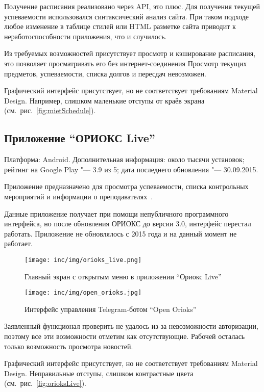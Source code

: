Получение расписания реализовано через API, это плюс.
Для получения текущей успеваемости использовался синтаксический анализ сайта.
При таком подходе любое изменение в таблице стилей или HTML разметке сайта приводит к неработоспособности приложения, что и случилось.

Из требуемых возможностей присутствует просмотр и кэширование расписания, это позволяет просматривать его без интернет-соединения
Просмотр текущих предметов, успеваемости, списка долгов и пересдач невозможен.

Графический интерфейс присутствует, но не соответствует требованиям Material Design.
Например, слишком маленькие отступы от краёв экрана (см.~рис.~\ref{fig:mietSchedule}).

\subsection{Приложение ``ОРИОКС Live''}
\label{subsec:appOrioksLive}
Платформа: Android.
Дополнительная информация: около тысячи установок;
рейтинг на Google Play "--- 3.9 из 5;
дата последнего обновления "--- 30.09.2015.

Приложение предназначено для просмотра успеваемости, списка контрольных мероприятий и информации о преподавателях~\cite{market:orioksLive}.

Данные приложение получает при помощи непубличного программного интерфейса, но после обновления ОРИОКС до версии 3.0, интерфейс перестал работать.
Приложение не обновлялось с 2015 года и на данный момент не работает.

\begin{figure}[ht]
    \texttt{[image: inc/img/orioks\_live.png]}
    \caption{Главный экран с открытым меню в приложении ``Ориокс Live''}
    \label{fig:orioksLive}
  \endminipage\hfill
  \centering
    \texttt{[image: inc/img/open\_orioks.jpg]}
    \caption{Интерфейс управления Telegram-ботом ``Open Orioks''}
    \label{fig:openOrioks}
  \endminipage
\end{figure}

Заявленный функционал проверить не удалось из-за невозможности авторизации, поэтому все эти возможности отметим как отсутствующие.
Рабочей осталась только возможность просмотра новостей.

Графический интерфейс присутствует, но не соответствует требованиям Material Design.
Неправильные отступы, слишком контрастные цвета (см.~рис.~\ref{fig:orioksLive}).


